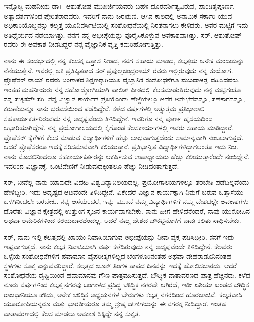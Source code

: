 ಇನ್ನೊಬ್ಬ ಮಹನೀಯ ಡಾ।। ಆಶುತೋಷ ಮುಖರ್ಜಿಯವರು ಬಹಳ ದೂರದರ್ಶಿತ್ವವಿರುವ, ಪಾಂಡಿತ್ಯಪೂರ್ಣ, ಅತ್ಯಾದರ್ಶಗಳಿಂದ ಪ್ರೇರಿತರಾದವರು. ಇವರಿಗೆ ನಾನು ಚಿರಋಣಿ. ಆಗಿನ ಕಾಲದಲ್ಲಿ ಅನಾಮಿಕ ಸರ್ಕಾರಿ ಯುವ ಅಧಿಕಾರಿಯೊಬ್ಬನನ್ನು ಕಲ್ಕತ್ತ ಯೂನಿವರ್ಸಿಟಿಯಲ್ಲಿ ಸಂಶೋಧನೆಯಲ್ಲಿ ನಿರತನಾಗಲು ಕೇಳಿದರು. ಅವರ ಮಟ್ಟಿಗೆ ಇದು ಅತಿಧೈರ್ಯದ ನಡೆಯಾಗಿತ್ತು. ನನಗೆ ನನ್ನ ಅಭೀಪ್ಸೆಯನ್ನು ಪೂರೈಸಿಕೊಳ್ಳುವ ಅವಕಾಶವಾಗಿತ್ತು. ಸರ್. ಆಶುತೋಷ್ ರವರು ಈ ಅವಕಾಶ ನೀಡದಿದ್ದರೆ ನನ್ನ ವೈಜ್ಞಾನಿಕ ವೃತ್ತಿ ಕಮರಿಹೋಗುತ್ತಿತ್ತು.

ನಾನು ಈ ಸಂದರ್ಭದಲ್ಲಿ ನನ್ನ ಕೆಲಸಕ್ಕೆ ಒತ್ತಾಸೆ ನೀಡಿದ, ನನಗೆ ಸಹಾಯ ಮಾಡಿದ, ಕಲ್ಕತ್ತೆಯ ಅನೇಕ ಮಂದಿಯನ್ನು ನೆನೆಯುತ್ತೇನೆ. ಇವರಲ್ಲಿ ಅತಿ ಪ್ರತಿಷ್ಠಿತರಾದ ಸರ್ ಪ್ರಫುಲ್ಲ\break ಚಂದ್ರರಾಯ್ ರವರು ಇಲ್ಲಿರುವುದು ನನ್ನ ಸುಯೋಗ. ಪ್ರೊಫೆಸರ್ ರಾಯ್ ರವರು ಬಂಗಾಳದ ಶಿಕ್ಷಣಕ್ಕಾಗಿಯೂ ವೈಜ್ಞಾನಿಕ ಸಂಶೋಧನೆಗೂ ಮುಂದಾಳತ್ವ ವಹಿಸಿದವರು. ಇಂತಹ ಮಹನೀಯರು ನನ್ನ ಸಹೋದ್ಯೋಗಿಯಾಗಿ ಪಾಲಿತ್ ಪೀಠದಲ್ಲಿ ಕೆಲಸಮಾಡುತ್ತಿರುವುದು ನನ್ನ ಮಟ್ಟಿಗಂತೂ ನನ್ನ ಸುಕೃತವೇ ಸರಿ. ನನ್ನ ವಿಜ್ಞಾನ ಕಾರ್ಯದ ಪ್ರತಿಯೊಂದು ಹೆಜ್ಜೆಯಲ್ಲೂ ಅವರ ಅನುಭವವನ್ನೂ, ಸಹಕಾರವನ್ನೂ, ಕರುಣೆಯನ್ನೂ ನಾನು ಭರವಸೆಯಿಂದ ಪಡೆದಿದ್ದೇನೆ. ಕಳೆದ  ವರ್ಷಗಳಲ್ಲಿ ಅತ್ಯುತ್ತಮ ಪ್ರತಿಭಾಶಾಲಿ ಸಹಕಾರ್ಯಕರ್ತರಿರುವುದು ನನ್ನ ಅದೃಷ್ಟವೆಂದು ತಿಳಿದಿದ್ದೇನೆ. ಇವರಿಗೂ ನನ್ನ ಪೂರ್ಣ ಹೃದಯದಿಂದ ಆಭಾರಿಯಾಗಿದ್ದೇನೆ. ನನ್ನ ಪ್ರಯೋಗಾಲಯದಲ್ಲಿ ಕೈಗೊಂಡ ಕೆಲಸಕಾರ್ಯಗಳಲ್ಲಿ ಇವರು ಸಹಾಯ ಮಾಡಿದ್ದಾರೆ. ಪ್ರೊಫೆಸರ್ ಕೈಗೆಳಗೆ ಕೆಲಸ ಮಾಡುವ ವಿದ್ಯಾರ್ಥಿಗಳಿಗೆ ಹೆಚ್ಚು ಲಾಭವಾಗುತ್ತದೆಂದು ಸಾಮಾನ್ಯವಾಗಿ ನಂಬಲಾಗುತ್ತದೆ. ಆದರೆ ಪ್ರೊಫೆಸರರೂ ಇದಕ್ಕೆ ಸರಿಸಮಾನವಾಗಿ ಕಲಿಯುತ್ತಾರೆ. ಪ್ರತಿಭಾನ್ವಿತ ವಿದ್ಯಾರ್ಥಿಗಳಿದ್ದಾಗಲಂತೂ ಇದು ನಿಜ. ನಾನು ಮೊದಲಿನಿಂದಲೂ ಸಹಕಾರ್ಯಕರ್ತರನ್ನು ಆಕರ್ಷಿಸುವ ಉಪಾಧ್ಯಾಯರು ಹೆಚ್ಚು ಕಲಿಯುತ್ತಾರೆಂದೇ ನಂಬಿದ್ದೇನೆ. ಇದರಿಂದ ವಿಜ್ಞಾನಕ್ಕೆ, ಒಂಟಿದೇಣಿಗೆ ನೀಡುವುದಕ್ಕಿಂತಲೂ ಹೆಚ್ಚು ನೀಡಿದಂತಾಗುತ್ತದೆ.

ಸರ್, ನೀವೆಲ್ಲ ನಾನು ಯಾವುದೇ ವಿದೇಶಿ ವಿಶ್ವವಿದ್ಯಾನಿಲಯದಲ್ಲಿ, ಪ್ರಯೋಗಾಲಯಗಳಲ್ಲೂ ತರಬೇತಿ ಪಡೆದಿಲ್ಲವೆಂದು ಹೇಳಿದ್ದೀರಿ. ಇದು ಅದೃಷ್ಟದ ಆಟವೆಂದೇ ತಿಳಿದಿದ್ದೇನೆ. ಏಕೆಂದರೆ ವಿಜ್ಞಾನ ಕಾರ್ಯಕ್ಕಾಗಿ ನಿಮಗೆ ಬರುವ ಒತ್ತಾಸೆಯು ಒಳಗಿನಿಂದಲೇ ಬರಬೇಕು. ನನ್ನ ಆಸೆಯೆಂದರೆ, ಇನ್ನು ಮುಂದೆ ನಮ್ಮ ವಿದ್ಯಾರ್ಥಿಗಳಿಗೆ ನಮ್ಮ ದೇಶದಲ್ಲೇ ಅವಕಾಶಗಳು ದೊರೆತು ವಿಜ್ಞಾನ ಕ್ಷೇತ್ರದಲ್ಲಿ ಉತ್ತುಂಗ ಸೃಜನ ಕಾರ್ಯವಾಗಬೇಕು. ನಾನು ಹೀಗೆ ಹೇಳಿದೆನೆಂದರೆ, ನಾವು ಯುರೋಪಿನ ಅಥವಾ ಅಮೆರಿಕಗಳಿಂದ ಕಲಿಯಬಾರದೆಂದಲ್ಲ. ಆದರೆ ನಮ್ಮ ದೇಶದ ಚೌಕಟ್ಟಿನೊಳಗೆ ನಾವು ಕಲಿತು ಸಾಧಿಸಬೇಕು.

ಸರ್, ನಾನು ಇಲ್ಲಿ ಕಲ್ಕತ್ತದಲ್ಲಿ ಖಾಯಂ ನಿವಾಸಿಯಾಗುವ ಅಭೀಪ್ಸೆಯನ್ನು ನೀವು ವ್ಯಕ್ತ ಪಡಿಸಿದ್ದೀರಿ. ನನಗೆ ಇದು ಇಷ್ಟವಾಗುತ್ತದೆ. ನಾನು ಕಲ್ಕತ್ತ ನಿವಾಸಿಯಾಗಿ  ವರ್ಷ ಕಳೆದಿರುವುದು ನನ್ನ ಅದೃಷ್ಟವೆಂದೇ ತಿಳಿದಿದ್ದೇನೆ. ಕೆಲವರು ಒಳ್ಳೆಯ ಸಂಶೋಧನೆಗಳಿಗೆ ಹವಾಮಾನ ವೈಪರೀತ್ಯಗಳಿಲ್ಲದ ಬೆಂಗಳೂರಿನಂತಹ ಅಥವಾ ಡೇಹರಾಡೂನಿನಂತಹ ಸ್ಥಳಗಳು ಸೂಕ್ತ ಎನ್ನುವವರಿದ್ದಾರೆ. ಕಲ್ಕತ್ತದ ಜೂನ್ ತಿಂಗಳ ತಾಪದ ದಿನವನ್ನು ಇದಕ್ಕೆ ಹೋಲಿಸಬಾರದು. ಆದರೆ ಸಂಶೋಧನೆಯ ದೃಷ್ಟಿಯಿಂದ ಹವಾಮಾನವು ಗೌಣ ಪಾತ್ರವಹಿಸುತ್ತದೆ. ಬೌದ್ಧಿಕ ವಾತಾವರಣದ ಪಾತ್ರ ಹೆಚ್ಚಿನದು. ಕಳೆದ ನೂರು ವರ್ಷಗಳಿಂದ ಕಲ್ಕತ್ತ ನಗರವು ಬಂಗಾಳದ ಪ್ರಸಿದ್ಧ ಬೌದ್ಧಿಕ ನಗರವೇ ಆಗಿರದೆ, ಇಡೀ ಏಶಿಯಾ ಖಂಡದ ಬೌದ್ಧಿಕ ರಾಜಧಾನಿಯೂ ಹೌದು, ಅನೇಕ ಬೌದ್ಧಿಕ ಅಧ್ಯಯನಗಳ ಬೇರುಗಳು ಕಲ್ಕತ್ತ ನಗರದಿಂದ ಹೊರಚಾಚಿವೆ. ಕಲ್ಕತ್ತವಾಸಿ ಯೂರೋಪಿಯನ್ನರೂ ಮತ್ತು ಭಾರತೀಯರೂ ತಮ್ಮ ಶ್ರೇಷ್ಠ ದೇಣಿಗೆಯನ್ನು ಈ ನಗರಕ್ಕೆ ನೀಡಿದ್ದಾರೆ. ಇಂತಹ ವಾತಾವರಣದಲ್ಲಿ ಕೆಲಸ ಮಾಡಲು ಅವಕಾಶ ಸಿಕ್ಕಿದ್ದೇ ನನ್ನ ಸುಕೃತ.

